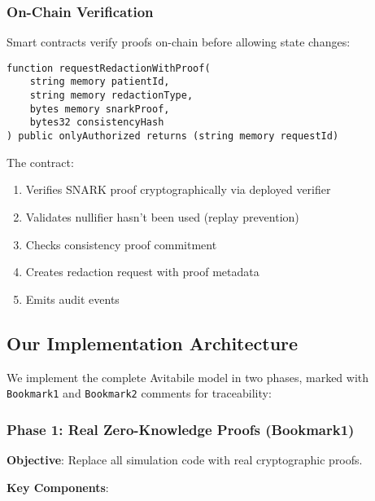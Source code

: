 \subsubsection{On-Chain Verification}

Smart contracts verify proofs on-chain before allowing state changes:

\begin{verbatim}
function requestRedactionWithProof(
    string memory patientId,
    string memory redactionType,
    bytes memory snarkProof,
    bytes32 consistencyHash
) public onlyAuthorized returns (string memory requestId)
\end{verbatim}

The contract:
\begin{enumerate}
    \item Verifies SNARK proof cryptographically via deployed verifier
    \item Validates nullifier hasn't been used (replay prevention)
    \item Checks consistency proof commitment
    \item Creates redaction request with proof metadata
    \item Emits audit events
\end{enumerate}

\subsection{Our Implementation Architecture}

We implement the complete Avitabile model in two phases, marked with \texttt{Bookmark1} and \texttt{Bookmark2} comments for traceability:

\subsubsection{Phase 1: Real Zero-Knowledge Proofs (Bookmark1)}

\textbf{Objective}: Replace all simulation code with real cryptographic proofs.

\textbf{Key Components}:

